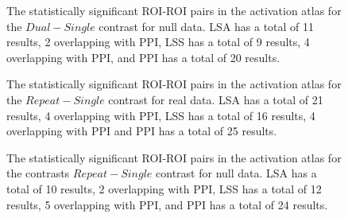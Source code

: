 \documentclass[phd,appendix,figures]{uithesis}
\begin{document}
\begin{figure}[H]
  \ContinuedFloat
  \centering


  \caption[All contrasts for all atlases for all data for LSA/LSS versus PPI continued...]{
      The statistically significant ROI-ROI pairs in the activation atlas
      for the $Dual - Single$ contrast for null data.
      LSA has a total of 11 results, 2 overlapping with PPI,
      LSS has a total of 9 results, 4 overlapping with PPI,
      and PPI has a total of 20 results.
  }
  \label{fig:data-null_type-brain_atlas-activation_contrast-dualxsingle}
\end{figure}

\begin{figure}[H]
  \ContinuedFloat
  \centering


  \caption[All contrasts for all atlases for all data for LSA/LSS versus PPI continued...]{
      The statistically significant ROI-ROI pairs in the activation atlas
      for the $Repeat - Single$ contrast for real data.
      LSA has a total of 21 results, 4 overlapping with PPI,
      LSS has a total of 16 results, 4 overlapping with PPI and
      PPI has a total of 25 results.
  }
  \label{fig:data-real_type-brain_atlas-activation_contrast-repeatxsingle}
\end{figure}

\begin{figure}[H]
  \ContinuedFloat
  \centering


  \caption[All contrasts for all atlases for all data for LSA/LSS versus PPI continued...]{
      The statistically significant ROI-ROI pairs in the activation atlas
      for the contrasts $Repeat - Single$ contrast for null data.
      LSA has a total of 10 results, 2 overlapping with PPI,
      LSS has a total of 12 results, 5 overlapping with PPI,
      and PPI has a total of 24 results.
  }
  \label{fig:data-null_type-brain_atlas-activation_contrast-repeatxsingle}
\end{figure}
\end{document}
